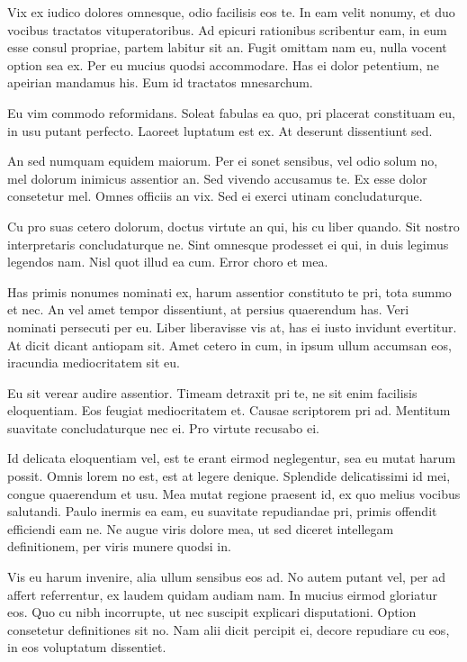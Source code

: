 \documentclass[
	12pt,				%
	openright,			%
	oneside,			%
	a4paper,			%
	english,			%
	french,				%
	spanish,			%
	brazil,				%
	]{abntex2}
\begin{document}
Vix ex iudico dolores omnesque, odio facilisis eos te. In eam velit nonumy, et duo vocibus tractatos vituperatoribus. Ad epicuri rationibus scribentur eam, in eum esse consul propriae, partem labitur sit an. Fugit omittam nam eu, nulla vocent option sea ex. Per eu mucius quodsi accommodare. Has ei dolor petentium, ne apeirian mandamus his. Eum id tractatos mnesarchum.

Eu vim commodo reformidans. Soleat fabulas ea quo, pri placerat constituam eu, in usu putant perfecto. Laoreet luptatum est ex. At deserunt dissentiunt sed.

An sed numquam equidem maiorum. Per ei sonet sensibus, vel odio solum no, mel dolorum inimicus assentior an. Sed vivendo accusamus te. Ex esse dolor consetetur mel. Omnes officiis an vix. Sed ei exerci utinam concludaturque.

Cu pro suas cetero dolorum, doctus virtute an qui, his cu liber quando. Sit nostro interpretaris concludaturque ne. Sint omnesque prodesset ei qui, in duis legimus legendos nam. Nisl quot illud ea cum. Error choro et mea.

Has primis nonumes nominati ex, harum assentior constituto te pri, tota summo et nec. An vel amet tempor dissentiunt, at persius quaerendum has. Veri nominati persecuti per eu. Liber liberavisse vis at, has ei iusto invidunt evertitur. At dicit dicant antiopam sit. Amet cetero in cum, in ipsum ullum accumsan eos, iracundia mediocritatem sit eu.

Eu sit verear audire assentior. Timeam detraxit pri te, ne sit enim facilisis eloquentiam. Eos feugiat mediocritatem et. Causae scriptorem pri ad. Mentitum suavitate concludaturque nec ei. Pro virtute recusabo ei.

Id delicata eloquentiam vel, est te erant eirmod neglegentur, sea eu mutat harum possit. Omnis lorem no est, est at legere denique. Splendide delicatissimi id mei, congue quaerendum et usu. Mea mutat regione praesent id, ex quo melius vocibus salutandi. Paulo inermis ea eam, eu suavitate repudiandae pri, primis offendit efficiendi eam ne. Ne augue viris dolore mea, ut sed diceret intellegam definitionem, per viris munere quodsi in.

Vis eu harum invenire, alia ullum sensibus eos ad. No autem putant vel, per ad affert referrentur, ex laudem quidam audiam nam. In mucius eirmod gloriatur eos. Quo cu nibh incorrupte, ut nec suscipit explicari disputationi. Option consetetur definitiones sit no. Nam alii dicit percipit ei, decore repudiare cu eos, in eos voluptatum dissentiet.
\end{document}
